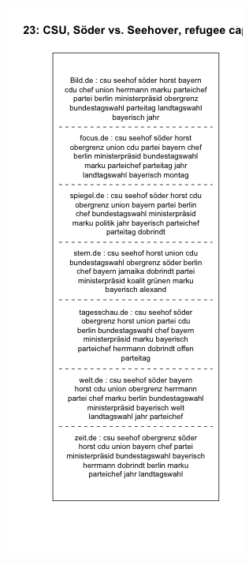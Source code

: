 \documentclass[12pt,a4paper,notitlepage]{article}
\begin{document}
{\begin{figure}[H]
\begin{center}
\begin{subfigure}[normla]{0.49\textwidth}
		\end{subfigure}
		\begin{subfigure}[normla]{0.49\textwidth}
			\includegraphics[width=\textwidth]{../figs/plotquote23.png}
		\end{subfigure}
	\end{center}
\end{figure}

}
\end{document}
